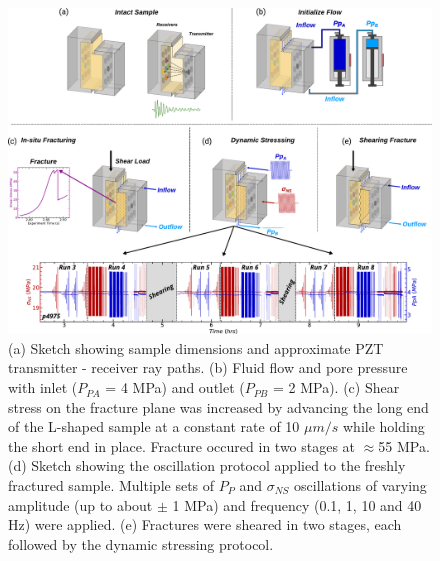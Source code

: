 \documentclass[letterpaper,10pt]{article}
\begin{document}
\newpage


\begin{figure}[ht]
	\centering
	\includegraphics[width=0.99\columnwidth]{exp_sequence_v3}
	\caption[]{(a) Sketch showing sample dimensions and approximate PZT transmitter - receiver ray paths.
		(b) Fluid flow and pore pressure with inlet ($P_{PA}$ = 4 MPa) and outlet ($P_{PB}$ = 2 MPa).
		(c) Shear stress on the fracture plane was increased by advancing the long end of the L-shaped sample at a constant rate of 10 $\mu m/s$ while holding the short end in place. Fracture occured in two stages at $ \approx $55 MPa.
		(d) Sketch showing the oscillation protocol applied to the freshly fractured sample. Multiple sets of $P_{P}$ and $ \sigma_{NS} $ oscillations of varying amplitude (up to about $ \pm $ 1 MPa) and frequency (0.1, 1, 10 and 40 Hz) were applied.
		(e) Fractures were sheared in two stages, each followed by the dynamic stressing protocol.}
	\label{fig:exp_seq}
\end{figure}


\newpage

\end{document}
